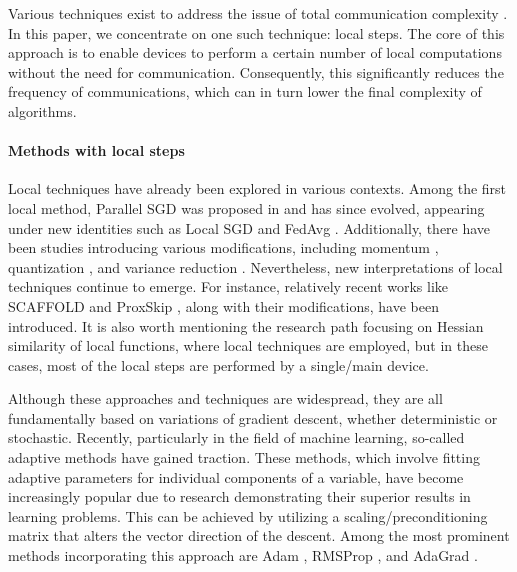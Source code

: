 \documentclass[sn-mathphys,Numbered]{sn-jnl}%
\renewcommand{\|}{\parallel}
\renewcommand {\*} {\ast}
\begin{document}

Various techniques exist to address the issue of total communication complexity \cite{arjevani2015communication, alistarh2017qsgd, smith2018cocoa, beznosikov2020biased}. In this paper, we concentrate on one such technique: local steps. The core of this approach is to enable devices to perform a certain number of local computations without the need for communication. Consequently, this significantly reduces the frequency of communications, which can in turn lower the final complexity of algorithms.

\paragraph{Methods with local steps}

Local techniques have already been explored in various contexts. Among the first local method, Parallel SGD was proposed in \cite{mangasarian1995parallel} and has since evolved, appearing under new identities such as Local SGD \cite{stich2018local} and FedAvg \cite{mcmahan2017communication}. Additionally, there have been studies introducing various modifications, including momentum \cite{wang2019slowmo}, quantization \cite{basu2020qsparse, reisizadeh2020fedpaq}, and variance reduction \cite{liang2019variance, sharma2019parallel}. Nevertheless, new interpretations of local techniques continue to emerge. For instance, relatively recent works like SCAFFOLD \cite{karimireddy2020scaffold} and ProxSkip \cite{mishchenko2022proxskip}, along with their modifications, have been introduced. It is also worth mentioning the research path focusing on Hessian similarity \cite{shamir2014communication, hendrikx2020statistically, beznosikov2021distributed, kovalev2022optimal} of local functions, where local techniques are employed, but in these cases, most of the local steps are performed by a single/main device.

Although these approaches and techniques are widespread, they are all fundamentally based on variations of gradient descent, whether deterministic or stochastic. Recently, particularly in the field of machine learning, so-called adaptive methods have gained traction. These methods, which involve fitting adaptive parameters for individual components of a variable, have become increasingly popular due to research demonstrating their superior results in learning problems. This can be achieved by utilizing a scaling/preconditioning matrix that alters the vector direction of the descent. Among the most prominent methods incorporating this approach are Adam \cite{kingma2014adam}, RMSProp \cite{tieleman2012lecture}, and AdaGrad \cite{duchi2011adaptive}.
\end{document}
